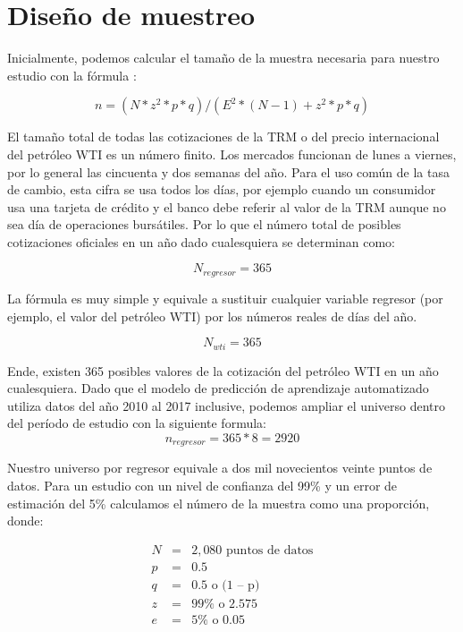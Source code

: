 \section{Diseño de muestreo}

Inicialmente, podemos calcular el tamaño de la muestra necesaria para nuestro estudio con la fórmula \cite{mendehall}:

\begin{equation}
   n =  (N* z^2*p*q)/(E^2*(N-1)+ z^2*p*q) 
\end{equation}

El tamaño total de todas las cotizaciones de la TRM o del precio internacional del petróleo WTI es un número finito. Los mercados funcionan de lunes a viernes, por lo general las cincuenta y dos semanas del año. Para el uso común de la tasa de cambio, esta cifra se usa todos los días, por ejemplo cuando un consumidor usa una tarjeta de crédito y el banco debe referir al valor de la TRM aunque no sea día de operaciones bursátiles. Por lo que el número total de posibles cotizaciones oficiales en un año dado cualesquiera se determinan como:

\begin{equation}
    N_{regresor} = 365
\end{equation}

La fórmula es muy simple y equivale a sustituir cualquier variable regresor (por ejemplo, el valor del petróleo WTI) por los números reales de días del año. 

\begin{equation}
    N_{wti} = 365
\end{equation}

Ende, existen 365 posibles valores de la cotización del petróleo WTI en un año cualesquiera. Dado que el modelo de predicción de aprendizaje automatizado utiliza datos del año 2010 al 2017 inclusive, podemos ampliar el universo dentro del período de estudio con la siguiente formula:
\begin{equation}
    n_{regresor} = 365 * 8 = 2920
\end{equation}

Nuestro universo por regresor equivale a dos mil novecientos veinte puntos de datos. Para un estudio con un nivel de confianza del 99\% y un error de estimación del 5\% calculamos el número de la muestra como una proporción, donde:

\begin{eqnarray*}
  N &=& 2,080 \text{ puntos de datos} \\
  p &=& 0.5 \\
  q &=& 0.5 \text{ o (1 – p)} \\
  z &=& 99\% \text{ o 2.575} \\
  e &=& 5\% \text{ o 0.05} \\
\end{eqnarray*}

